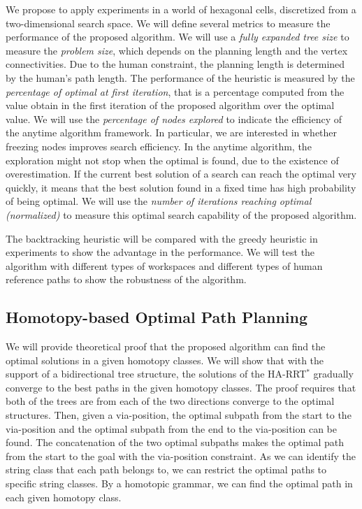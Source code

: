 \documentclass[phd]{byuprop}
\begin{document}
We propose to apply experiments in a world of hexagonal cells,  discretized from a two-dimensional search space.
We will define several metrics to measure the performance of the proposed algorithm.
We will use a \emph{fully expanded tree size} to measure the \emph{problem size}, which depends on the planning length and the vertex connectivities.
Due to the human constraint, the planning length is determined by the human's path length.
The performance of the heuristic is measured by the \emph{percentage of optimal at first iteration}, that is a percentage computed from the value obtain in the first iteration of the proposed algorithm over the optimal value.
We will use the \emph{percentage of nodes explored} to indicate the efficiency of the anytime algorithm framework.
In particular, we are interested in whether freezing nodes improves search efficiency.
In the anytime algorithm, the exploration might not stop when the optimal is found, due to the existence of overestimation.
If the current best solution of a search can reach the optimal very quickly, it means that the best solution found in a fixed time has high probability of being optimal.
We will use the \emph{number of iterations reaching optimal (normalized)} to measure this optimal search capability of the proposed algorithm.

The backtracking heuristic will be compared with the greedy heuristic in experiments to show the advantage in the performance.
We will test the algorithm with different types of workspaces and different types of human reference paths to show the robustness of the algorithm.


\subsection{Homotopy-based Optimal Path Planning}
\label{sec:validation:homotopy_based_optimal_path_planning}

We will provide theoretical proof that the proposed algorithm can find the optimal solutions in a given homotopy classes.
We will show that with the support of a bidirectional tree structure, the solutions of the HA-RRT$^{*}$ gradually converge to the best paths in the given homotopy classes.
The proof requires that both of the trees are from each of the two directions converge to the optimal structures.
Then, given a via-position, the optimal subpath from the start to the via-position and the optimal subpath from the end to the via-position can be found.
The concatenation of the two optimal subpaths makes the optimal path from the start to the goal with the via-position constraint.
As we can identify the string class that each path belongs to, we can restrict the optimal paths to specific string classes.
By a homotopic grammar, we can find the optimal path in each given homotopy class.
\end{document}
